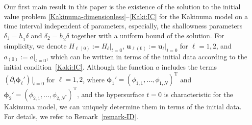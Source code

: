 \documentclass[11pt,leqno]{article}
\numberwithin{equation}{section}
\numberwithin{figure}{section}
\begin{document}
Our first main result in this paper is the existence of the solution to the initial value problem 
\eqref{Kakinuma-dimensionless}--\eqref{Kaki:IC} for the Kakinuma model on a time interval independent of 
parameters, especially, the shallowness parameters $\delta_1=\underline{h}_1\delta$ and $\delta_2=\underline{h}_2\delta$ 
together with a uniform bound of the solution. 
For simplicity, we denote $H_{\ell(0)}:=H_\ell|_{t=0}$, $\bm{u}_{\ell(0)}:=\bm{u}_\ell|_{t=0}$ for $\ell=1,2$, 
and $a_{(0)}:=a|_{t=0}$, which can be written in terms of the initial data according to the initial condition~\eqref{Kaki:IC}. 
Although the function $a$ includes the terms $(\partial_t\bm{\phi}_\ell')|_{t=0}$ for $\ell=1,2$, where 
$\bm{\phi}_1'=(\phi_{1,1},\ldots,\phi_{1,N})^\mathrm{T}$ and  $\bm{\phi}_2'=(\phi_{2,1},\ldots,\phi_{2,N^*})^\mathrm{T}$, 
and the hypersurface $t=0$ is characteristic for the Kakinuma model, 
we can uniquely determine them in terms of the initial data. 
For details, we refer to Remark~\ref{remark-ID}. 
\end{document}
